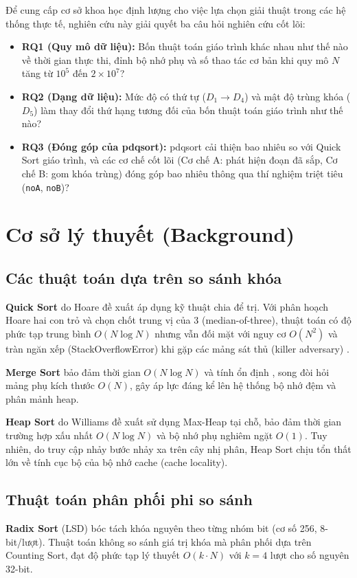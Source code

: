 \documentclass[conference]{IEEEtran}
\begin{document}
Để cung cấp cơ sở khoa học định lượng cho việc lựa chọn giải thuật trong các hệ thống thực tế, nghiên cứu này giải quyết ba câu hỏi nghiên cứu cốt lõi:
\begin{itemize}
    \item \textbf{RQ1 (Quy mô dữ liệu):} Bốn thuật toán giáo trình khác nhau như thế nào về thời gian thực thi, đỉnh bộ nhớ phụ và số thao tác cơ bản khi quy mô $N$ tăng từ $10^5$ đến $2\times 10^7$?
    \item \textbf{RQ2 (Dạng dữ liệu):} Mức độ có thứ tự ($D_1 \to D_4$) và mật độ trùng khóa ($D_5$) làm thay đổi thứ hạng tương đối của bốn thuật toán giáo trình như thế nào?
    \item \textbf{RQ3 (Đóng góp của pdqsort):} pdqsort cải thiện bao nhiêu so với Quick Sort giáo trình, và các cơ chế cốt lõi (Cơ chế A: phát hiện đoạn đã sắp, Cơ chế B: gom khóa trùng) đóng góp bao nhiêu thông qua thí nghiệm triệt tiêu (\texttt{noA}, \texttt{noB})?
\end{itemize}

\section{Cơ sở lý thuyết (Background)}
\subsection{Các thuật toán dựa trên so sánh khóa}
\textbf{Quick Sort} do Hoare đề xuất \cite{hoare1962quicksort} áp dụng kỹ thuật chia để trị. Với phân hoạch Hoare hai con trỏ và chọn chốt trung vị của 3 (median-of-three), thuật toán có độ phức tạp trung bình $O(N \log N)$ nhưng vẫn đối mặt với nguy cơ $O(N^2)$ và tràn ngăn xếp (StackOverflowError) khi gặp các mảng sát thủ (killer adversary) \cite{musser1997introsort}.

\textbf{Merge Sort} bảo đảm thời gian $O(N \log N)$ và tính ổn định \cite{sedgewick2011algorithms}, song đòi hỏi mảng phụ kích thước $O(N)$, gây áp lực đáng kể lên hệ thống bộ nhớ đệm và phân mảnh heap.

\textbf{Heap Sort} do Williams đề xuất \cite{williams1964heapsort} sử dụng Max-Heap tại chỗ, bảo đảm thời gian trường hợp xấu nhất $O(N \log N)$ và bộ nhớ phụ nghiêm ngặt $O(1)$. Tuy nhiên, do truy cập nhảy bước nhảy xa trên cây nhị phân, Heap Sort chịu tổn thất lớn về tính cục bộ của bộ nhớ cache (cache locality).

\subsection{Thuật toán phân phối phi so sánh}
\textbf{Radix Sort} (LSD) \cite{sedgewick2011algorithms} bóc tách khóa nguyên theo từng nhóm bit (cơ số 256, 8-bit/lượt). Thuật toán không so sánh giá trị khóa mà phân phối dựa trên Counting Sort, đạt độ phức tạp lý thuyết $O(k \cdot N)$ với $k=4$ lượt cho số nguyên 32-bit.
\end{document}
